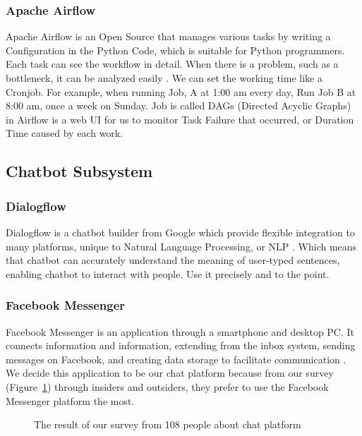 \documentclass[12pt,oneside,openright,a4paper]{cpe-english-project}
\begin{document}
\subsubsection{Apache Airflow}
Apache Airflow is an Open Source that manages various tasks by writing a Configuration in
the Python Code, which is suitable for Python programmers. Each task can see the workflow
in detail. When there is a problem, such as a bottleneck, it can be analyzed easily \cite{apache_airflow}.
We can set the working time like a Cronjob. For example, when running Job, A at 1:00 am
every day, Run Job B at 8:00 am, once a week on Sunday. Job is called DAGs
(Directed Acyclic Graphs) in Airflow is a web UI for us to monitor Task Failure
that occurred, or Duration Time caused by each work.

\subsection{Chatbot Subsystem}
\subsubsection{Dialogflow}
Dialogflow is a chatbot builder from Google which provide flexible integration to many platforms,
unique to Natural Language Processing, or NLP \cite{dialogflow}. Which means that chatbot can
accurately understand the meaning of user-typed sentences, enabling chatbot to interact with people.
Use it precisely and to the point.

\subsubsection{Facebook Messenger}
Facebook Messenger is an application through a smartphone and desktop PC. It connects information
and information, extending from the inbox system, sending messages on Facebook, and creating data
storage to facilitate communication \cite{wiki_fb_messenger}.\\
We decide this application to be our chat platform because from our survey (Figure~\ref*{fig:ch3_result_survey})
through insiders and outsiders, they prefer to use the Facebook Messenger platform the most.

\begin{figure}[h!]
  \centering
  \setlength{\fboxrule}{0.2mm}
  \setlength{\fboxsep}{0.5cm}
  \caption{The result of our survey from 108 people about chat platform}
  \label{fig:ch3_result_survey}
\end{figure}
\end{document}

